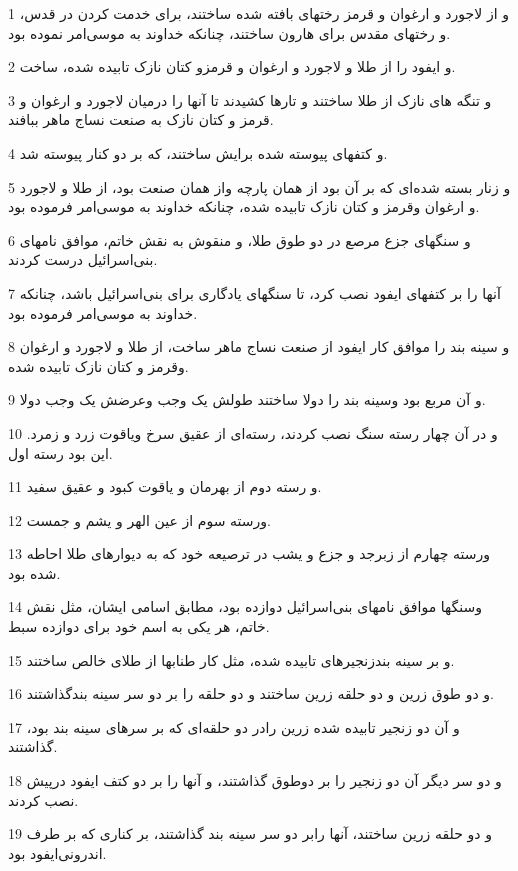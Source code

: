 \par 1 و از لاجورد و ارغوان و قرمز رختهای بافته شده ساختند، برای خدمت کردن در قدس، و رختهای مقدس برای هارون ساختند، چنانکه خداوند به موسی‌امر نموده بود.
\par 2 و ایفود را از طلا و لاجورد و ارغوان و قرمزو کتان نازک تابیده شده، ساخت.
\par 3 و تنگه های نازک از طلا ساختند و تارها کشیدند تا آنها را درمیان لاجورد و ارغوان و قرمز و کتان نازک به صنعت نساج ماهر ببافند.
\par 4 و کتفهای پیوسته شده برایش ساختند، که بر دو کنار پیوسته شد.
\par 5 و زنار بسته شده‌ای که بر آن بود از همان پارچه واز همان صنعت بود، از طلا و لاجورد و ارغوان وقرمز و کتان نازک تابیده شده، چنانکه خداوند به موسی‌امر فرموده بود.
\par 6 و سنگهای جزع مرصع در دو طوق طلا، و منقوش به نقش خاتم، موافق نامهای بنی‌اسرائیل درست کردند.
\par 7 آنها را بر کتفهای ایفود نصب کرد، تا سنگهای یادگاری برای بنی‌اسرائیل باشد، چنانکه خداوند به موسی‌امر فرموده بود.
\par 8 و سینه بند را موافق کار ایفود از صنعت نساج ماهر ساخت، از طلا و لاجورد و ارغوان وقرمز و کتان نازک تابیده شده. 
\par 9 و آن مربع بود وسینه بند را دولا ساختند طولش یک وجب وعرضش یک وجب دولا.
\par 10 و در آن چهار رسته سنگ نصب کردند، رسته‌ای از عقیق سرخ ویاقوت زرد و زمرد. این بود رسته اول.
\par 11 و رسته دوم از بهرمان و یاقوت کبود و عقیق سفید.
\par 12 ورسته سوم از عین الهر و یشم و جمست.
\par 13 ورسته چهارم از زبرجد و جزع و یشب در ترصیعه خود که به دیوارهای طلا احاطه شده بود.
\par 14 وسنگها موافق نامهای بنی‌اسرائیل دوازده بود، مطابق اسامی ایشان، مثل نقش خاتم، هر یکی به اسم خود برای دوازده سبط.
\par 15 و بر سینه بندزنجیرهای تابیده شده، مثل کار طنابها از طلای خالص ساختند.
\par 16 و دو طوق زرین و دو حلقه زرین ساختند و دو حلقه را بر دو سر سینه بندگذاشتند.
\par 17 و آن دو زنجیر تابیده شده زرین رادر دو حلقه‌ای که بر سرهای سینه بند بود، گذاشتند.
\par 18 و دو سر دیگر آن دو زنجیر را بر دوطوق گذاشتند، و آنها را بر دو کتف ایفود در‌پیش نصب کردند.
\par 19 و دو حلقه زرین ساختند، آنها رابر دو سر سینه بند گذاشتند، بر کناری که بر طرف اندرونی‌ایفود بود.
